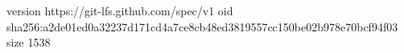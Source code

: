 version https://git-lfs.github.com/spec/v1
oid sha256:a2de01ed0a32237d171cd4a7ce8cb48ed3819557cc150be02b978e70bcf94f03
size 1538
